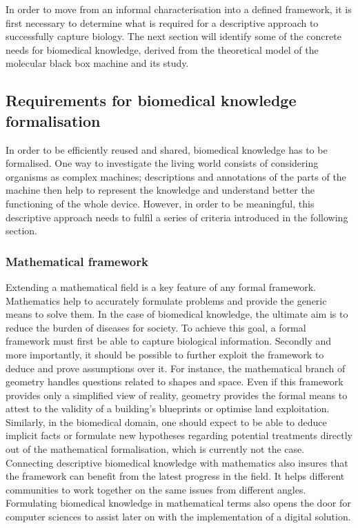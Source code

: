 In order to move from an informal characterisation into a defined framework, it is first necessary to determine what is required for a descriptive approach to successfully capture biology. The next section will identify some of the concrete needs for biomedical knowledge, derived from the theoretical model of the molecular black box machine and its study.

\subsection{Requirements for biomedical knowledge formalisation}

In order to be efficiently reused and shared, biomedical knowledge has to be formalised. One way to investigate the living world consists of considering organisms as complex machines; descriptions and annotations of the parts of the machine then help to represent the knowledge and understand better the functioning of the whole device. However, in order to be meaningful, this descriptive approach needs to fulfil a series of criteria introduced in the following section.

\subsubsection{Mathematical framework}
\label{reqmath}

Extending a mathematical field is a key feature of any formal framework. Mathematics help to accurately formulate problems and provide the generic means to solve them. In the case of biomedical knowledge, the ultimate aim is to reduce the burden of diseases for society. To achieve this goal, a formal framework must first be able to capture biological information. Secondly and more importantly, it should be possible to further exploit the framework to deduce and prove assumptions over it. For instance, the mathematical branch of geometry handles questions related to shapes and space. Even if this framework provides only a simplified view of reality, geometry provides the formal means to attest to the validity of a building’s blueprints or optimise land exploitation. Similarly, in the biomedical domain, one should expect to be able to deduce implicit facts or formulate new hypotheses regarding potential treatments directly out of the mathematical formalisation, which is currently not the case. Connecting descriptive biomedical knowledge with mathematics also insures that the framework can benefit from the latest progress in the field. It helps different communities to work together on the same issues from different angles. Formulating biomedical knowledge in mathematical terms also opens the door for computer sciences to assist later on with the implementation of a digital solution.

